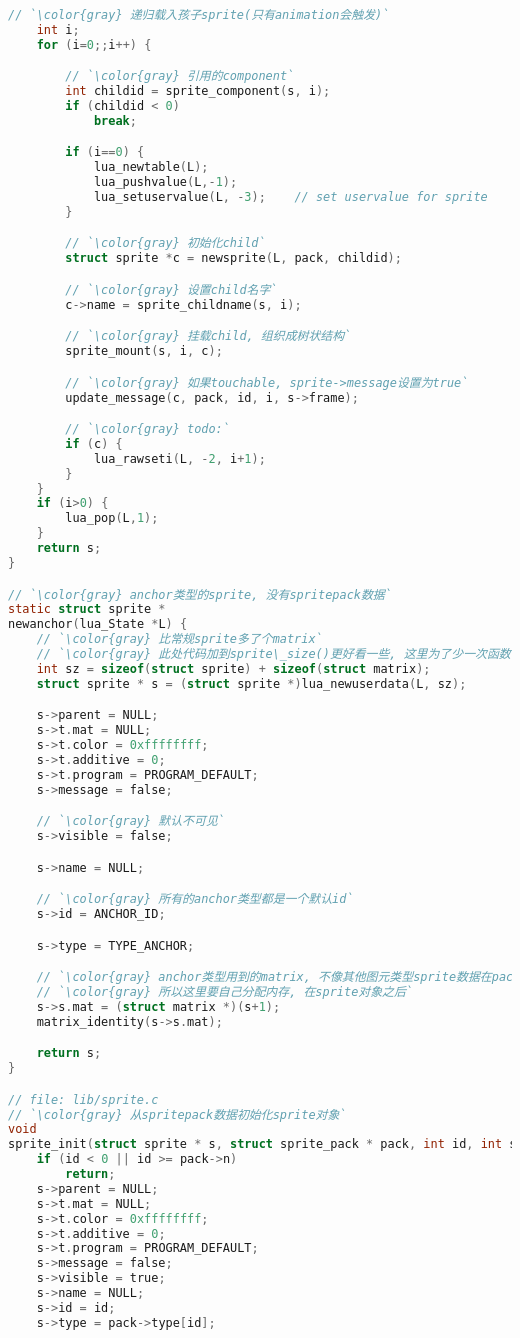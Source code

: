 {\begin{lstlisting}[language=C]
    // `\color{gray} 递归载入孩子sprite(只有animation会触发)`
    int i;
    for (i=0;;i++) {

        // `\color{gray} 引用的component`
        int childid = sprite_component(s, i);
        if (childid < 0)
            break;

        if (i==0) {
            lua_newtable(L);
            lua_pushvalue(L,-1);
            lua_setuservalue(L, -3);    // set uservalue for sprite
        }

        // `\color{gray} 初始化child`
        struct sprite *c = newsprite(L, pack, childid);

        // `\color{gray} 设置child名字`
        c->name = sprite_childname(s, i);

        // `\color{gray} 挂载child, 组织成树状结构`
        sprite_mount(s, i, c);

        // `\color{gray} 如果touchable, sprite->message设置为true`
        update_message(c, pack, id, i, s->frame);

        // `\color{gray} todo:`
        if (c) {
            lua_rawseti(L, -2, i+1);
        }
    }
    if (i>0) {
        lua_pop(L,1);
    }
    return s;
}

// `\color{gray} anchor类型的sprite, 没有spritepack数据`
static struct sprite *
newanchor(lua_State *L) {
    // `\color{gray} 比常规sprite多了个matrix`
    // `\color{gray} 此处代码加到sprite\_size()更好看一些, 这里为了少一次函数调用?`
    int sz = sizeof(struct sprite) + sizeof(struct matrix);
    struct sprite * s = (struct sprite *)lua_newuserdata(L, sz);

    s->parent = NULL;
    s->t.mat = NULL;
    s->t.color = 0xffffffff;
    s->t.additive = 0;
    s->t.program = PROGRAM_DEFAULT;
    s->message = false;

    // `\color{gray} 默认不可见`
    s->visible = false;

    s->name = NULL;

    // `\color{gray} 所有的anchor类型都是一个默认id`
    s->id = ANCHOR_ID;

    s->type = TYPE_ANCHOR;

    // `\color{gray} anchor类型用到的matrix, 不像其他图元类型sprite数据在pack包中,`
    // `\color{gray} 所以这里要自己分配内存, 在sprite对象之后`
    s->s.mat = (struct matrix *)(s+1);
    matrix_identity(s->s.mat);

    return s;
}

// file: lib/sprite.c
// `\color{gray} 从spritepack数据初始化sprite对象`
void
sprite_init(struct sprite * s, struct sprite_pack * pack, int id, int sz) {
    if (id < 0 || id >= pack->n)
        return;
    s->parent = NULL;
    s->t.mat = NULL;
    s->t.color = 0xffffffff;
    s->t.additive = 0;
    s->t.program = PROGRAM_DEFAULT;
    s->message = false;
    s->visible = true;
    s->name = NULL;
    s->id = id;
    s->type = pack->type[id];


\end{lstlisting}}
